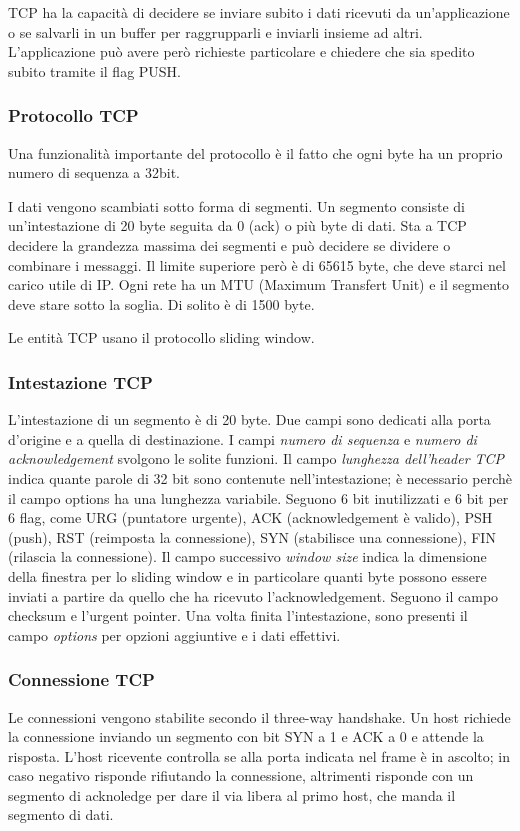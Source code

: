 TCP ha la capacità di decidere se inviare subito i dati ricevuti da un'applicazione o se salvarli in un buffer per raggrupparli e inviarli insieme ad altri.
L'applicazione può avere però richieste particolare e chiedere che sia spedito subito tramite il flag PUSH.

\subsubsection{Protocollo TCP}
Una funzionalità importante del protocollo è il fatto che ogni byte ha un proprio numero di sequenza a 32bit.

I dati vengono scambiati sotto forma di segmenti.
Un segmento consiste di un'intestazione di 20 byte seguita da 0 (ack) o più byte di dati.
Sta a TCP decidere la grandezza massima dei segmenti e può decidere se dividere o combinare i messaggi.
Il limite superiore però è di 65615 byte, che deve starci nel carico utile di IP.
Ogni rete ha un MTU (Maximum Transfert Unit) e il segmento deve stare sotto la soglia.
Di solito è di 1500 byte.

Le entità TCP usano il protocollo sliding window.

\subsubsection{Intestazione TCP}
L'intestazione di un segmento è di 20 byte.
Due campi sono dedicati alla porta d'origine e a quella di destinazione.
I campi \textit{numero di sequenza} e \textit{numero di acknowledgement} svolgono le solite funzioni.
Il campo \textit{lunghezza dell'header TCP} indica quante parole di 32 bit sono contenute nell'intestazione; 
è necessario perchè il campo options ha una lunghezza variabile.
Seguono 6 bit inutilizzati e 6 bit per 6 flag, come URG (puntatore urgente), ACK (acknowledgement è valido), PSH (push), RST (reimposta la connessione), SYN (stabilisce una connessione), FIN (rilascia la connessione).
Il campo successivo \textit{window size} indica la dimensione della finestra per lo sliding window e in particolare quanti byte possono essere inviati a partire da quello che ha ricevuto l'acknowledgement.
Seguono il campo checksum e l'urgent pointer.
Una volta finita l'intestazione, sono presenti il campo \textit{options} per opzioni aggiuntive e i dati effettivi.

\subsubsection{Connessione TCP}
Le connessioni vengono stabilite secondo il three-way handshake.
Un host richiede la connessione inviando un segmento con bit SYN a 1 e ACK a 0 e attende la risposta.
L'host ricevente controlla se alla porta indicata nel frame è in ascolto; in caso negativo risponde rifiutando la connessione, 
altrimenti risponde con un segmento di acknoledge per dare il via libera al primo host, che manda il segmento di dati.

